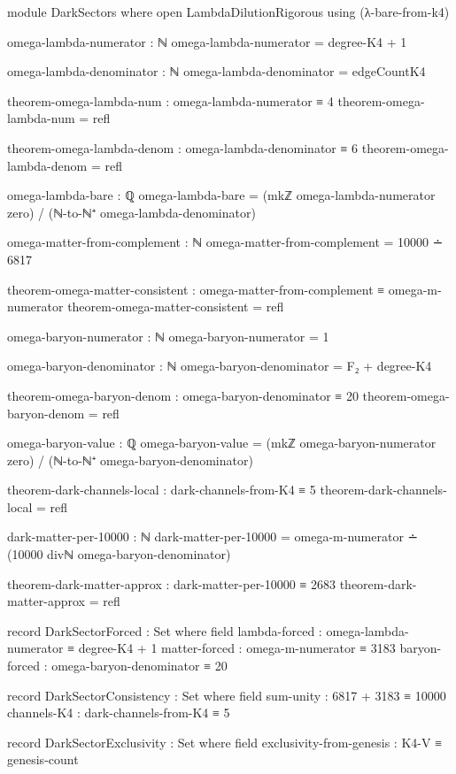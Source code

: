 \documentclass[11pt,a4paper]{book}
\begin{document}
\begin{code}
module DarkSectors where
  open LambdaDilutionRigorous using (λ-bare-from-k4)
  
  omega-lambda-numerator : ℕ
  omega-lambda-numerator = degree-K4 + 1
  
  omega-lambda-denominator : ℕ
  omega-lambda-denominator = edgeCountK4
  
  theorem-omega-lambda-num : omega-lambda-numerator ≡ 4
  theorem-omega-lambda-num = refl
  
  theorem-omega-lambda-denom : omega-lambda-denominator ≡ 6
  theorem-omega-lambda-denom = refl
  
  omega-lambda-bare : ℚ
  omega-lambda-bare = (mkℤ omega-lambda-numerator zero) / (ℕ-to-ℕ⁺ omega-lambda-denominator)
  
  omega-matter-from-complement : ℕ
  omega-matter-from-complement = 10000 ∸ 6817
  
  theorem-omega-matter-consistent : omega-matter-from-complement ≡ omega-m-numerator
  theorem-omega-matter-consistent = refl
  
  omega-baryon-numerator : ℕ
  omega-baryon-numerator = 1
  
  omega-baryon-denominator : ℕ
  omega-baryon-denominator = F₂ + degree-K4
  
  theorem-omega-baryon-denom : omega-baryon-denominator ≡ 20
  theorem-omega-baryon-denom = refl
  
  omega-baryon-value : ℚ
  omega-baryon-value = (mkℤ omega-baryon-numerator zero) / (ℕ-to-ℕ⁺ omega-baryon-denominator)
  
  theorem-dark-channels-local : dark-channels-from-K4 ≡ 5
  theorem-dark-channels-local = refl
  
  dark-matter-per-10000 : ℕ
  dark-matter-per-10000 = omega-m-numerator ∸ (10000 divℕ omega-baryon-denominator)
  
  theorem-dark-matter-approx : dark-matter-per-10000 ≡ 2683
  theorem-dark-matter-approx = refl
  
  record DarkSectorForced : Set where
    field
      lambda-forced : omega-lambda-numerator ≡ degree-K4 + 1
      matter-forced : omega-m-numerator ≡ 3183
      baryon-forced : omega-baryon-denominator ≡ 20
  
  record DarkSectorConsistency : Set where
    field
      sum-unity   : 6817 + 3183 ≡ 10000
      channels-K4 : dark-channels-from-K4 ≡ 5
  
  record DarkSectorExclusivity : Set where
    field
      exclusivity-from-genesis : K4-V ≡ genesis-count
  

\end{code}
\end{document}
